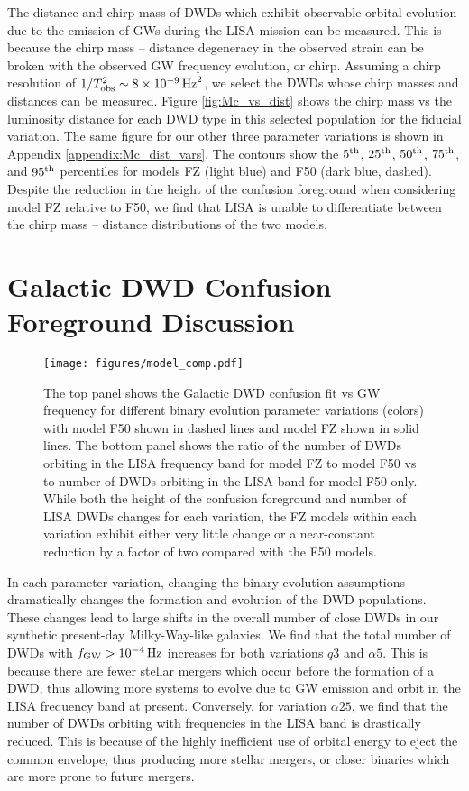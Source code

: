 \documentclass[twocolumn, linenumbers]{aastex631}
\begin{document}
The distance and chirp mass of DWDs which exhibit observable orbital 
evolution due to the emission of GWs during the LISA mission can be 
measured. This is because the chirp mass -- distance degeneracy in the 
observed strain can be broken with the observed GW frequency evolution, or 
chirp. Assuming a chirp resolution of $1/T_{\rm{obs}}^2 \sim 
8\times10^{-9}\,\rm{Hz}^2$, we select the DWDs whose chirp masses and 
distances can be measured. Figure \ref{fig:Mc_vs_dist} shows the chirp 
mass vs the luminosity distance for each DWD type in this selected 
population for the fiducial variation. The same figure for our other three 
parameter variations is shown in Appendix \ref{appendix:Mc_dist_vars}. The 
contours show the $5^{\rm{th}}$, $25^{\rm{th}}$, $50^{\rm{th}}$, 
$75^{\rm{th}}$, and $95^{\rm{th}}$ percentiles for models FZ (light blue) 
and F50 (dark blue, dashed). Despite the reduction in the height of the 
confusion foreground when considering model FZ relative to F50, we find 
that LISA is unable to differentiate between the chirp mass -- distance 
distributions of the two models. 

\section{Galactic DWD Confusion Foreground Discussion}
\label{sec:model_compare}


\begin{figure}
	\texttt{[image: figures/model\_comp.pdf]}
    \caption{The top panel shows the Galactic DWD confusion fit vs GW 
frequency for different binary evolution parameter variations (colors) 
with model F50 shown in dashed lines and model FZ shown in solid lines. 
The bottom panel shows the ratio of the number of DWDs orbiting in the 
LISA frequency band for model FZ to model F50 vs to number of DWDs 
orbiting in the LISA band for model F50 only. While both the height of the 
confusion foreground and number of LISA DWDs changes for each variation, 
the FZ models within each variation exhibit either very little change or a  
near-constant reduction by a factor of two compared with the F50 models.}
    \label{fig:model_comp}
\end{figure}

In each parameter variation, changing the binary evolution assumptions 
dramatically changes the formation and evolution of the DWD populations. 
These changes lead to large shifts in the overall number of close DWDs in 
our synthetic present-day Milky-Way-like galaxies. We find that the total 
number of DWDs with $f_{\rm{GW}}>10^{-4}\,\rm{Hz}$ increases for both 
variations $q3$ and $\alpha5$. This is because there are fewer stellar 
mergers which occur before the formation of a DWD, thus allowing more 
systems to evolve due to GW emission and orbit in the LISA frequency band 
at present. Conversely, for variation $\alpha25$, we find that the number 
of DWDs orbiting with frequencies in the LISA band is drastically reduced. 
This is because of the highly inefficient use of orbital energy to eject 
the common envelope, thus producing more stellar mergers, or closer 
binaries which are more prone to future mergers.
\end{document}
